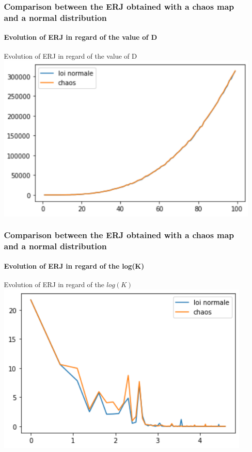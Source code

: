 \documentclass{beamer}
\begin{document}
\begin{frame}
	\frametitle{\color{velvet}Comparison between the ERJ obtained with a chaos map and a normal distribution}
	\framesubtitle{Evolution of ERJ in regard of the value of D}
	Evolution of ERJ in regard of the value of D
	\includegraphics[scale=0.7]{normale/erreur_en_fct_de_D.png}
\end{frame}
	
\begin{frame}
	\frametitle{\color{velvet}Comparison between the ERJ obtained with a chaos map and a normal distribution}
	\framesubtitle{Evolution of ERJ in regard of the log(K)}
	Evolution of ERJ in regard of the $log(K)$
	\includegraphics[scale=0.7]{normale/erreur_en_fct_de_logK_3.png}
\end{frame}
	
\end{document}
